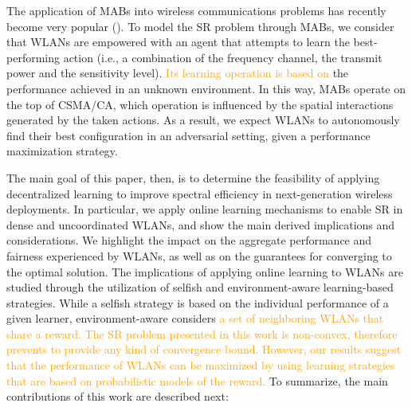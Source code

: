 \documentclass[preprint,12pt]{elsarticle}
\begin{document}
The application of MABs into wireless communications problems has recently become very popular (\citealp{chen2010distributed, maghsudi2015channel, maghsudi2015joint}). To model the SR problem through MABs, we consider that WLANs are empowered with an agent that attempts to learn the best-performing action (i.e., a combination of the frequency channel, the transmit power and the sensitivity level). \textcolor{orange}{Its learning operation is based on} the performance achieved in an unknown environment. In this way, MABs operate on the top of CSMA/CA, which operation is influenced by the spatial interactions generated by the taken actions. As a result, we expect WLANs to autonomously find their best configuration in an adversarial setting, given a performance maximization strategy.

The main goal of this paper, then, is to determine the feasibility of applying decentralized learning to improve spectral efficiency in next-generation wireless deployments. In particular, we apply online learning mechanisms to enable SR in dense and uncoordinated WLANs, and show the main derived implications and considerations. We highlight the impact on the aggregate performance and fairness experienced by WLANs, as well as on the guarantees for converging to the optimal solution. The implications of applying online learning to WLANs are studied through the utilization of selfish and environment-aware learning-based strategies. While a selfish strategy is based on the individual performance of a given learner, environment-aware considers \textcolor{orange}{a set of neighboring WLANs that share a reward.} \textcolor{orange}{The SR problem presented in this work is non-convex, therefore prevents to provide any kind of convergence bound. However, our results suggest that the performance of WLANs can be maximized by using learning strategies that are based on probabilistic models of the reward.} To summarize, the main contributions of this work are described next:
\end{document}
